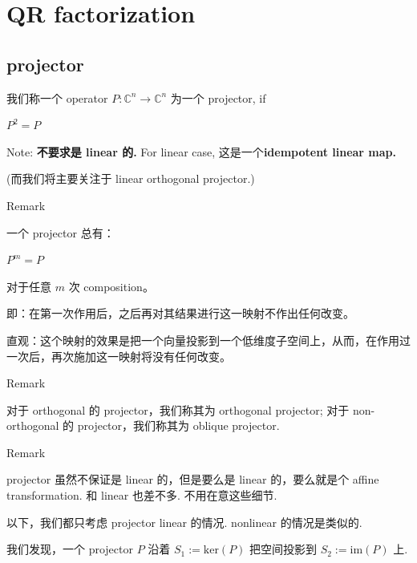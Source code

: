 \chapter{QR factorization}

\section{projector}

\begin{definition}

我们称一个 operator \(P:\mathbb{C}^{n}\rightarrow\mathbb{C}^{n}\) 为一个 projector, if

\(P^{2} = P\)

Note: \textbf{不要求是 linear 的.} For linear case, 这是一个\textbf{idempotent linear map.}

(而我们将主要关注于 linear orthogonal projector.)

\end{definition}

\begin{qlremark}{Remark}

一个 projector 总有：

\(P^{m} = P\)

对于任意 \(m\) 次 composition。

即：在第一次作用后，之后再对其结果进行这一映射不作出任何改变。

直观：这个映射的效果是把一个向量投影到一个低维度子空间上，从而，在作用过一次后，再次施加这一映射将没有任何改变。

\end{qlremark}

\begin{qlremark}{Remark}

对于 orthogonal 的 projector，我们称其为 orthogonal projector; 对于 non-orthogonal 的 projector，我们称其为 oblique projector.

\end{qlremark}

\begin{qlremark}{Remark}

projector 虽然不保证是 linear 的，但是要么是 linear 的，要么就是个 affine transformation. 和 linear 也差不多. 不用在意这些细节.

\end{qlremark}

以下，我们都只考虑 projector linear 的情况. nonlinear 的情况是类似的.

\begin{lemma}

我们发现，一个 projector \(P\) 沿着 \(S_{1} := \text{ker}(P)\) 把空间投影到 \(S_{2} := \text{im}(P)\) 上.

\end{lemma}

